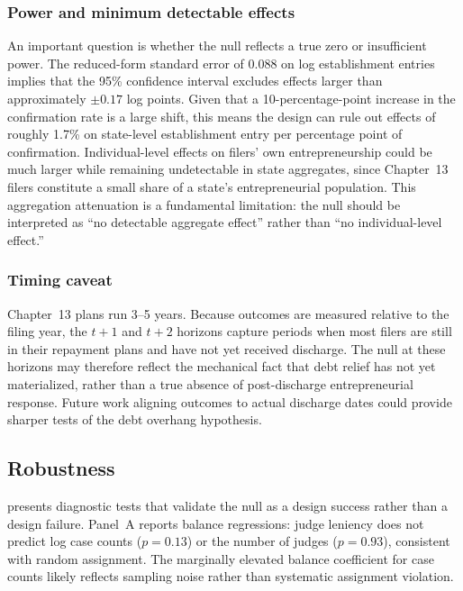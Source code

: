 \documentclass[12pt]{article}
\begin{document}
\subsubsection*{Power and minimum detectable effects} An important question is whether the null reflects a true zero or insufficient power. The reduced-form standard error of 0.088 on log establishment entries implies that the 95\% confidence interval excludes effects larger than approximately $\pm 0.17$ log points. Given that a 10-percentage-point increase in the confirmation rate is a large shift, this means the design can rule out effects of roughly 1.7\% on state-level establishment entry per percentage point of confirmation. Individual-level effects on filers' own entrepreneurship could be much larger while remaining undetectable in state aggregates, since Chapter~13 filers constitute a small share of a state's entrepreneurial population. This aggregation attenuation is a fundamental limitation: the null should be interpreted as ``no detectable aggregate effect'' rather than ``no individual-level effect.''

\subsubsection*{Timing caveat} Chapter~13 plans run 3--5 years. Because outcomes are measured relative to the filing year, the $t+1$ and $t+2$ horizons capture periods when most filers are still in their repayment plans and have not yet received discharge. The null at these horizons may therefore reflect the mechanical fact that debt relief has not yet materialized, rather than a true absence of post-discharge entrepreneurial response. Future work aligning outcomes to actual discharge dates could provide sharper tests of the debt overhang hypothesis.

\subsection{Robustness}



 presents diagnostic tests that validate the null as a design success rather than a design failure. Panel~A reports balance regressions: judge leniency does not predict log case counts ($p=0.13$) or the number of judges ($p=0.93$), consistent with random assignment. The marginally elevated balance coefficient for case counts likely reflects sampling noise rather than systematic assignment violation.
\end{document}
